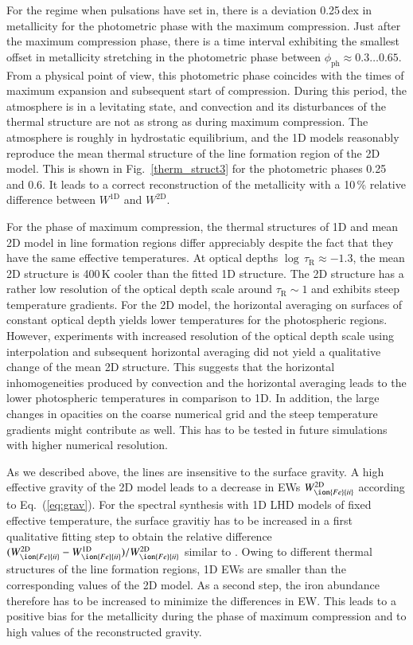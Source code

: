 \documentclass{aa}
\begin{document}
For the regime when pulsations have set in, there is a deviation 0.25\,dex in metallicity for the photometric phase with the maximum compression. Just
after the maximum compression phase, there is a time interval exhibiting the
smallest offset in metallicity stretching in the photometric phase between
$\phi_\mathrm{ph}\approx 0.3 \ldots 0.65$.  From a physical point of view, this
photometric phase coincides with the times of maximum expansion and subsequent
start of compression. During this period, the atmosphere is in a levitating
state, and convection and its disturbances of the thermal structure are not as
strong as during maximum compression.  The atmosphere is roughly in
hydrostatic equilibrium, and the 1D models reasonably reproduce the mean
thermal structure of the line formation region of the 2D model. This is shown in Fig.~\ref{therm_struct3} for the photometric phases 0.25 and 0.6.  It
leads to a correct reconstruction of the metallicity with a 10\,\% relative
difference between $W^\mathrm{1D}$ and $W^\mathrm{2D}$.

For the phase of maximum compression, the thermal structures of 1D and mean 2D
model in line formation regions differ appreciably despite the fact that they
have the same effective temperatures.  At optical depths $\log \,
\tau_\mathrm{R} \approx -1.3$, the mean 2D structure is 400\,K cooler than the
fitted 1D structure.  The 2D structure has a rather low resolution of the
optical depth scale around $\tau_\mathrm{R} \sim 1$ and exhibits steep
temperature gradients. For the 2D model, the horizontal averaging on surfaces
of constant optical depth yields lower temperatures for the photospheric
regions. However, experiments with increased resolution of the optical depth
scale using interpolation and subsequent horizontal averaging did not yield a
qualitative change of the mean 2D structure. This suggests that the
  horizontal inhomogeneities produced by convection and the horizontal
  averaging leads to the lower photospheric temperatures in comparison to 1D.
  In addition, the large changes in opacities on the coarse numerical grid
  and the steep temperature gradients might contribute as well. This has to be
  tested in future simulations with higher numerical resolution. 

As we described above, the  lines are insensitive to the surface
gravity. A high effective gravity of the 2D model leads to a decrease in
 EWs $W^\mathrm{2D}_{\ion{Fe}{ii}}$ according to
Eq.~(\ref{eq:grav}).  For the spectral synthesis with 1D LHD models of fixed
effective temperature, the surface gravitiy has to be increased
in a first qualitative fitting step to obtain the relative difference
$(W^\mathrm{2D}_{\ion{Fe}{ii}}-W^\mathrm{1D}_{\ion{Fe}{ii}})
/W^\mathrm{2D}_{\ion{Fe}{ii}}$ similar to .  Owing to different
thermal structures of the line formation regions, 1D EWs are
smaller than the corresponding values of the 2D model.  As a second
step,  the iron abundance therefore has to be increased
to minimize the differences in
EW.  This leads to a positive bias for the metallicity during the
phase of maximum compression and to high values of the reconstructed gravity.
\end{document}

